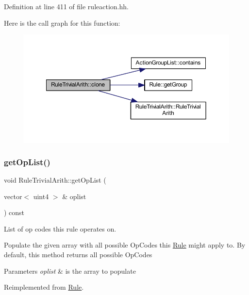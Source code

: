 Definition at line 411 of file ruleaction.\+hh.

Here is the call graph for this function\+:
\nopagebreak
\begin{figure}[H]
\begin{center}
\leavevmode
\includegraphics[width=350pt]{class_rule_trivial_arith_a2c92af6c8447390481239efa67e5ece7_cgraph}
\end{center}
\end{figure}
\mbox{\label{class_rule_trivial_arith_a5ea9eaec045f952aac8c2af5198bdda0}} 
\subsubsection{\texorpdfstring{getOpList()}{getOpList()}}
{\footnotesize\ttfamily void Rule\+Trivial\+Arith\+::get\+Op\+List (\begin{DoxyParamCaption}\item[{vector$<$ uint4 $>$ \&}]{oplist }\end{DoxyParamCaption}) const\hspace{0.3cm}{\ttfamily [virtual]}}



List of op codes this rule operates on. 

Populate the given array with all possible Op\+Codes this \mbox{\hyperlink{class_rule}{Rule}} might apply to. By default, this method returns all possible Op\+Codes 
\begin{DoxyParams}{Parameters}
{\em oplist} & is the array to populate \\
\hline
\end{DoxyParams}


Reimplemented from \mbox{\hyperlink{class_rule_a4023bfc7825de0ab866790551856d10e}{Rule}}.



